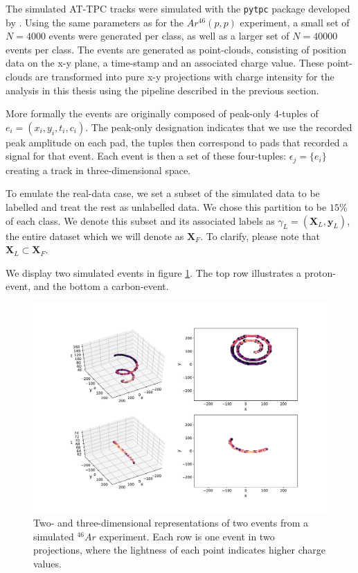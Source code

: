 The simulated AT-TPC tracks were simulated with the \lstinline{pytpc} package developed by \citet{Bradt2017a}. Using the same parameters as for the $Ar^{46}(p, p)$ experiment, a small set of $N=4000$ events were generated per class, as well as a larger set of $N=40000$ events per class. The events are generated as point-clouds, consisting of position data on the x-y plane, a time-stamp and an associated charge value. These point-clouds are transformed into pure x-y projections with charge intensity for the analysis in this thesis using the pipeline described in the previous section. 

More formally the events are originally composed of peak-only 4-tuples of $e_i = (x_i, y_i, t_i, c_i)$. The peak-only designation indicates that we use the recorded peak amplitude on each pad, the tuples then correspond to pads that recorded a signal for that event. Each event is then a set of these four-tuples: $\epsilon_j = \{e_i\}$ creating a track in three-dimensional space. 

To emulate the real-data case, we set a subset of the simulated data to be labelled and treat the rest as unlabelled data. We chose this partition to be $15\%$ of each class. We denote this subset and its associated labels as $\gamma_L=(\boldsymbol{X}_L, \boldsymbol{y}_L)$, the entire dataset which we will denote as $\boldsymbol{X}_F$. To clarify, please note that $\boldsymbol{X}_L \subset \boldsymbol{X}_F$.

We display two simulated events in figure \ref{fig:sim_samples}. The top row illustrates a proton-event, and the bottom a carbon-event. 

\begin{figure}[ht]
\centering
\includegraphics[width=\textwidth]{../plots/display_eventssimulated.pdf}
\caption[Displaying simulated events in 2D and 3D]{Two- and three-dimensional representations of two events from a simulated ${}^{46}Ar$ experiment. Each row is one event in two projections, where the lightness of each point indicates higher charge values.}\label{fig:sim_samples}
\end{figure}


